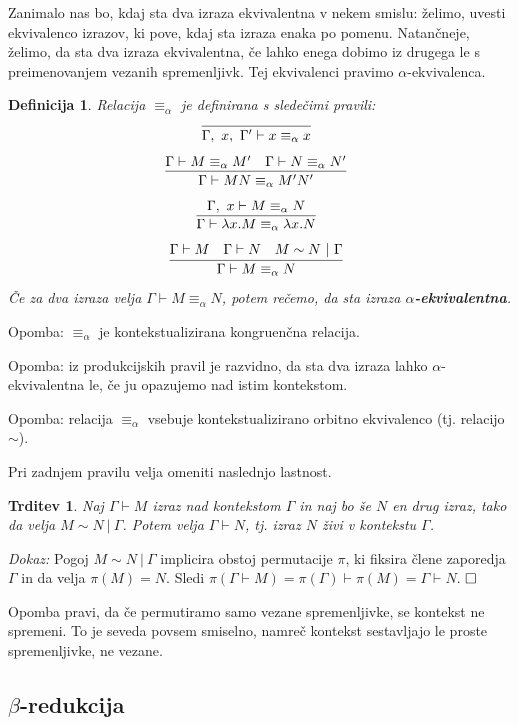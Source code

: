 \documentclass{article}
\newcommand{\inference}[3][]{\infer[#1]{#3}{#2}}
\def\qed{$\hfill\Box$}   %
\newtheorem{trditev}{Trditev}
\newtheorem{definicija}{Definicija}
\begin{document}
Zanimalo nas bo, kdaj sta dva izraza ekvivalentna v nekem smislu: želimo, uvesti ekvivalenco izrazov, ki pove, kdaj sta izraza enaka po pomenu. Natančneje, želimo, da sta dva izraza ekvivalentna, če lahko enega dobimo iz drugega le s preimenovanjem vezanih spremenljivk. Tej ekvivalenci pravimo \(\alpha\)-ekvivalenca.

\begin{definicija}
    Relacija \(\equiv_\alpha\) je definirana s sledečimi pravili:
    \[
        \inference[]{}{\Gamma,\ x,\ \Gamma' \vdash x \equiv_\alpha x}
    \]
    \[
        \inference{\Gamma \vdash M \equiv_\alpha M' \quad \Gamma \vdash N \equiv_\alpha N'}{\Gamma \vdash MN \equiv_\alpha M'N'}
    \]
    \[
        \inference{\Gamma,\ x \vdash M \equiv_\alpha N}{\Gamma \vdash \lambda x.M \equiv_\alpha \lambda x.N}
    \]
    \[
        \inference{\Gamma \vdash M \quad \Gamma \vdash N \quad M \sim N \ \vert\ \Gamma}{\Gamma \vdash M \equiv_\alpha N}
    \]
    Če za dva izraza velja \(\Gamma \vdash M \equiv_\alpha N\), potem rečemo, da sta izraza \textbf{\(\alpha\)-ekvivalentna}.
\end{definicija}
Opomba: \(\equiv_\alpha\) je kontekstualizirana kongruenčna relacija.

Opomba: iz produkcijskih pravil je razvidno, da sta dva izraza lahko \(\alpha\)-ekvivalentna le, če ju opazujemo nad istim kontekstom.

Opomba: relacija \(\equiv_\alpha\) vsebuje kontekstualizirano orbitno ekvivalenco (tj. relacijo \(\sim\)).

Pri zadnjem pravilu velja omeniti naslednjo lastnost.

\begin{trditev}
    Naj \(\Gamma \vdash M\) izraz nad kontekstom \(\Gamma\) in naj bo še \(N\) en drug izraz, tako da velja \(M \sim N \ \vert\ \Gamma\). Potem velja \(\Gamma \vdash N\), tj. izraz \(N\) živi v kontekstu \(\Gamma\).
\end{trditev}

\noindent
{\em Dokaz:\/}
Pogoj \(M \sim N \ \vert\ \Gamma\) implicira obstoj permutacije \(\pi\), ki fiksira člene zaporedja \(\Gamma\) in da velja \(\pi(M) = N\). Sledi \(\pi(\Gamma \vdash M) = \pi(\Gamma) \vdash \pi(M) = \Gamma \vdash N\).
\qed

Opomba pravi, da če permutiramo samo vezane spremenljivke, se kontekst ne spremeni. To je seveda povsem smiselno, namreč kontekst sestavljajo le proste spremenljivke, ne vezane.

\subsection{\(\beta\)-redukcija}
\end{document}
